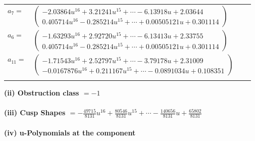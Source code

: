 \documentclass[1p]{elsarticle_modified}
\theoremstyle{definition}
\begin{document}
\begin{tabular}{m{7pt} m{180pt} m{7pt} m{180pt} }
\flushright $a_{7}=$&$\begin{pmatrix}-2.03864 u^{16}+3.21241 u^{15}+\cdots-6.13918 u+2.03644\\0.405714 u^{16}-0.285214 u^{15}+\cdots+0.00505121 u+0.301114\end{pmatrix}$ \\
\flushright $a_{6}=$&$\begin{pmatrix}-1.63293 u^{16}+2.92720 u^{15}+\cdots-6.13413 u+2.33755\\0.405714 u^{16}-0.285214 u^{15}+\cdots+0.00505121 u+0.301114\end{pmatrix}$ \\
\flushright $a_{11}=$&$\begin{pmatrix}-1.71543 u^{16}+2.52797 u^{15}+\cdots-3.79178 u+2.31009\\-0.0167876 u^{16}+0.211167 u^{15}+\cdots-0.0891034 u+0.108351\end{pmatrix}$\\&\end{tabular}
\flushleft \textbf{(ii) Obstruction class $= -1$}\\~\\
\flushleft \textbf{(iii) Cusp Shapes $= -\frac{49715}{8131} u^{16}+\frac{80546}{8131} u^{15}+\cdots-\frac{140656}{8131} u+\frac{65802}{8131}$}\\~\\
\newpage\renewcommand{\arraystretch}{1}
\flushleft \textbf{(iv) u-Polynomials at the component}\newline \\
\end{document}

